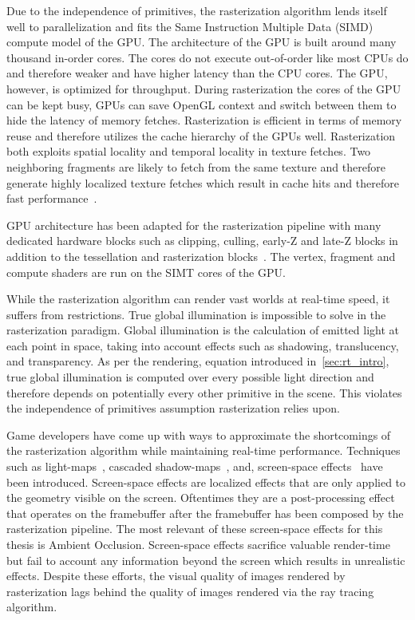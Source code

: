 Due to the independence of primitives, the rasterization algorithm lends itself well to parallelization and fits the Same Instruction Multiple Data (SIMD) compute model of the GPU. The architecture of the GPU is built around many thousand in-order cores. The cores do not execute out-of-order like most CPUs do and therefore weaker and have higher latency than the CPU cores. The GPU, however, is optimized for throughput. During rasterization the cores of the GPU can be kept busy, GPUs can save OpenGL context and switch between them to hide the latency of memory fetches. 
Rasterization is efficient in terms of memory reuse and therefore utilizes the cache hierarchy of the GPUs well. Rasterization both exploits spatial locality and temporal locality in texture fetches. Two neighboring fragments are likely to fetch from the same texture and therefore generate highly localized texture fetches which result in cache hits and therefore fast performance~\cite{10.1145/37402.37414}.  

GPU architecture has been adapted for the rasterization pipeline with many dedicated hardware blocks such as clipping, culling, early-Z and late-Z blocks in addition to the tessellation and rasterization blocks~\cite{10.1145/3307650.3322221}. The vertex, fragment and compute shaders are run on the SIMT cores of the GPU.

While the rasterization algorithm can render vast worlds at real-time speed, it suffers from restrictions. True global illumination is impossible to solve in the rasterization paradigm. Global illumination is the calculation of emitted light at each point in space, taking into account effects such as shadowing, translucency, and transparency. As per the rendering, equation introduced in~\autoref{sec:rt_intro}, true global illumination is computed over every possible light direction and therefore depends on potentially every other primitive in the scene. This violates the independence of primitives assumption rasterization relies upon. 

Game developers have come up with ways to approximate the shortcomings of the rasterization algorithm while maintaining real-time performance. Techniques such as light-maps~\cite{10.1145/3102163.3102202}, cascaded shadow-maps~\cite{article_shadow_maps}, and, screen-space effects~\cite{10.5555/1407436} have been introduced. Screen-space effects are localized effects that are only applied to the geometry visible on the screen. Oftentimes they are a post-processing effect that operates on the framebuffer after the framebuffer has been composed by the rasterization pipeline. The most relevant of these screen-space effects for this thesis is Ambient Occlusion. Screen-space effects sacrifice valuable render-time but fail to account any information beyond the screen which results in unrealistic effects.
Despite these efforts, the visual quality of images rendered by rasterization lags behind the quality of images rendered via the ray tracing algorithm. 

